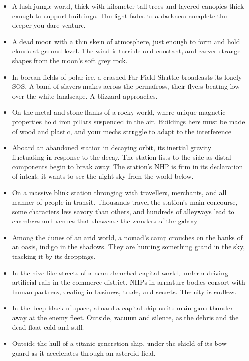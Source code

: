 \begin{itemize}
    \item A lush jungle world, thick with kilometer-tall trees and layered canopies thick enough to support buildings. The light fades to a darkness complete the deeper you dare venture.
    \item A dead moon with a thin skein of atmosphere, just enough to form and hold clouds at ground level. The wind is terrible and constant, and carves strange shapes from the moon’s soft grey rock.
    \item In borean fields of polar ice, a crashed Far-Field Shuttle broadcasts its lonely SOS. A band of slavers makes across the permafrost, their flyers beating low over the white landscape. A blizzard approaches.
    \item On the metal and stone flanks of a rocky world, where unique magnetic properties hold iron pillars suspended in the air. Buildings here must be made of wood and plastic, and your mechs struggle to adapt to the interference.
    \item Aboard an abandoned station in decaying orbit, its inertial gravity fluctuating in response to the decay. The station lists to the side as distal components begin to break away. The station’s NHP is firm in its declaration of intent: it wants to see the night sky from the world below.
    \item On a massive blink station thronging with travellers, merchants, and all manner of people in transit. Thousands travel the station’s main concourse, some characters less savory than others, and hundreds of alleyways lead to chambers and venues that showcase the wonders of the galaxy.
    \item Among the dunes of an arid world, a nomad’s camp crouches on the banks of an oasis, indigo in the shadows. They are hunting something grand in the sky, tracking it by its droppings.
    \item In the hive-like streets of a neon-drenched capital world, under a driving artificial rain in the commerce district. NHPs in armature bodies consort with human partners, dealing in business, trade, and secrets. The city is endless.
    \item In the deep black of space, aboard a capital ship as its main guns thunder away at the enemy fleet. Outside, vacuum and silence, as the debris and the dead float cold and still.
    \item Outside the hull of a titanic generation ship, under the shield of its bow guard as it accelerates through an asteroid field.

\end{itemize}
